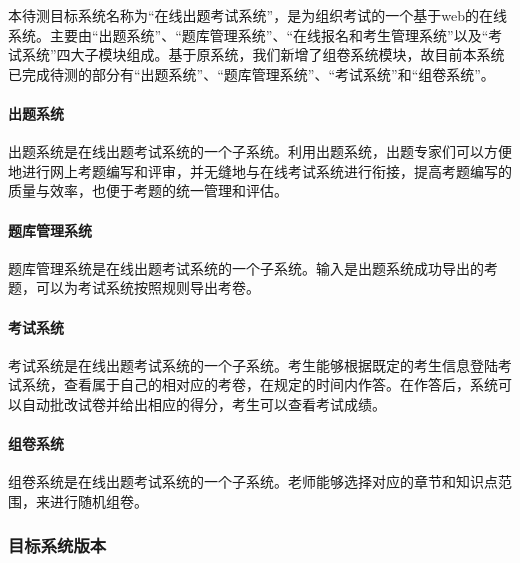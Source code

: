 \documentclass[hyperref, a4paper]{ctexart}
\let\oldparagraph\paragraph
\renewcommand{\paragraph}[1]{\oldparagraph{#1}\mbox{}}
\begin{document}
本待测目标系统名称为``在线出题考试系统''，是为组织考试的一个基于web的在线系统。主要由``出题系统''、``题库管理系统''、``在线报名和考生管理系统''以及``考试系统''四大子模块组成。基于原系统，我们新增了组卷系统模块，故目前本系统已完成待测的部分有``出题系统''、``题库管理系统''、``考试系统''和``组卷系统''。

\hypertarget{ux51faux9898ux7cfbux7edf}{%
\paragraph{出题系统}\label{ux51faux9898ux7cfbux7edf}}

出题系统是在线出题考试系统的一个子系统。利用出题系统，出题专家们可以方便地进行网上考题编写和评审，并无缝地与在线考试系统进行衔接，提高考题编写的质量与效率，也便于考题的统一管理和评估。

\hypertarget{ux9898ux5e93ux7ba1ux7406ux7cfbux7edf}{%
\paragraph{题库管理系统}\label{ux9898ux5e93ux7ba1ux7406ux7cfbux7edf}}

题库管理系统是在线出题考试系统的一个子系统。输入是出题系统成功导出的考题，可以为考试系统按照规则导出考卷。

\hypertarget{ux8003ux8bd5ux7cfbux7edf}{%
\paragraph{考试系统}\label{ux8003ux8bd5ux7cfbux7edf}}

考试系统是在线出题考试系统的一个子系统。考生能够根据既定的考生信息登陆考试系统，查看属于自己的相对应的考卷，在规定的时间内作答。在作答后，系统可以自动批改试卷并给出相应的得分，考生可以查看考试成绩。

\hypertarget{ux7ec4ux5377ux7cfbux7edf}{%
\paragraph{组卷系统}\label{ux7ec4ux5377ux7cfbux7edf}}

组卷系统是在线出题考试系统的一个子系统。老师能够选择对应的章节和知识点范围，来进行随机组卷。

\hypertarget{ux76eeux6807ux7cfbux7edfux7248ux672c}{%
\subsubsection{目标系统版本}\label{ux76eeux6807ux7cfbux7edfux7248ux672c}}
\end{document}
